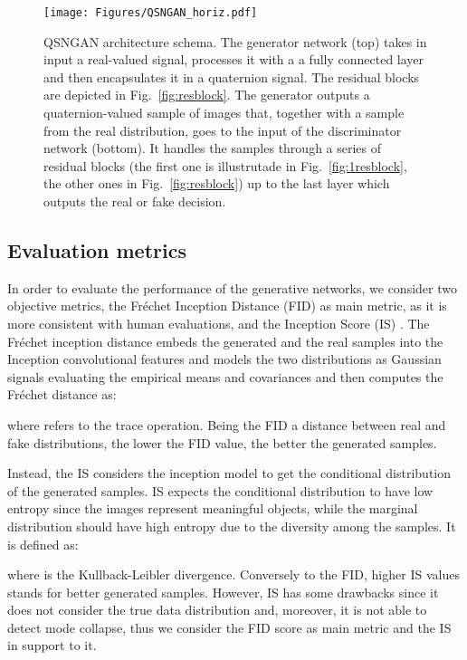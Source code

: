 \documentclass[graybox]{svmult}
\begin{document}
\begin{figure}[t]
    \centering
    \texttt{[image: Figures/QSNGAN\_horiz.pdf]}
    \caption{QSNGAN architecture schema. The generator network (top) takes in input a real-valued signal, processes it with a a fully connected layer and then encapsulates it in a quaternion signal. The residual blocks are depicted in Fig.~\ref{fig:resblock}. The generator outputs a quaternion-valued sample of images that, together with a sample from the real distribution, goes to the input of the discriminator network (bottom). It handles the samples through a series of residual blocks (the first one is illustrutade in Fig.~\ref{fig:1resblock}, the other ones in Fig.~\ref{fig:resblock}) up to the last layer which outputs the real or fake decision.}
    \label{fig:qsngan}
\end{figure}

\subsection{Evaluation metrics}
In order to evaluate the performance of the generative networks, we consider two objective metrics, the Fréchet Inception Distance (FID) \cite{HeuselFID2017} as main metric, as it is more consistent with human evaluations, and the Inception Score (IS) \cite{SalimansIS2016}. The Fréchet inception distance embeds the generated and the real samples into the Inception convolutional features and models the two distributions as Gaussian signals evaluating the empirical means  and covariances  and then computes the Fréchet distance as:



\noindent where  refers to the trace operation. Being the FID a distance between real and fake distributions, the lower the FID value, the better the generated samples.

Instead, the IS considers the inception model to get the conditional distribution  of the generated samples. IS expects the conditional distribution to have low entropy since the images represent meaningful objects, while the marginal distribution  should have high entropy due to the diversity among the samples. It is defined as:



\noindent where  is the Kullback-Leibler divergence. Conversely to the FID, higher IS values stands for better generated samples. However, IS has some drawbacks since it does not consider the true data distribution and, moreover, it is not able to detect mode collapse, thus we consider the FID score as main metric and the IS in support to it. 
\end{document}
